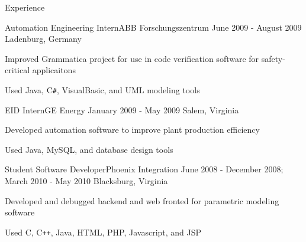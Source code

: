 \documentclass{resume}
\begin{document}
\begin{section}{Experience}
		\begin{experience}{Automation Engineering Intern}{ABB Forschungszentrum}
		                  {June 2009 - August 2009}
		                  {Ladenburg, Germany}
			\item Improved Grammatica project for use in code verification software
			      for safety-critical applicaitons
			\item Used Java, C\texttt{\#}, VisualBasic, and UML modeling tools
		\end{experience}

		\begin{experience}{EID Intern}{GE Energy}
		                  {January 2009 - May 2009}
		                  {Salem, Virginia}
			\item Developed automation software to improve plant production
			      efficiency
			\item Used Java, MySQL, and database design tools
		\end{experience}

		\begin{experience}{Student Software Developer}{Phoenix Integration}
		                  {June 2008 - December 2008; March 2010 - May 2010}
		                  {Blacksburg, Virginia}
			\item Developed and debugged backend and web fronted for parametric
			      modeling software
			\item Used C, C\texttt{++}, Java, HTML, PHP, Javascript, and JSP
		\end{experience}
	\end{section}
\end{document}

